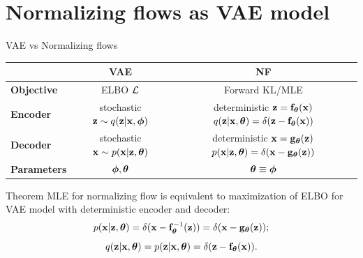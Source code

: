 \section{Normalizing flows as VAE model}
\begin{frame}{VAE vs Normalizing flows}
	\begin{table}[]
		\begin{tabular}{l|c|c}
			& \textbf{VAE} & \textbf{NF} \\ \hline
			\textbf{Objective} & ELBO $\mathcal{L}$ & Forward KL/MLE \\ \hline
			\textbf{Encoder} & \shortstack{stochastic \\ $\mathbf{z} \sim q (\mathbf{z} | \mathbf{x}, \boldsymbol{\phi})$} &  \shortstack{\\ deterministic \\ $\mathbf{z} = \mathbf{f}_{\boldsymbol{\theta}}(\mathbf{x})$ \\ $q(\mathbf{z} | \mathbf{x}, \boldsymbol{\theta}) = \delta(\mathbf{z} - \mathbf{f}_{\boldsymbol{\theta}}(\mathbf{x}))$}  \\ \hline
			\textbf{Decoder} & \shortstack{stochastic \\ $\mathbf{x} \sim p (\mathbf{x} | \mathbf{z}, \boldsymbol{\theta})$} & \shortstack{\\ deterministic \\ $\mathbf{x} = \mathbf{g}_{\boldsymbol{\theta}}(\mathbf{z})$ \\ $ p(\mathbf{x} | \mathbf{z}, \boldsymbol{\theta}) = \delta(\mathbf{x} - \mathbf{g}_{\boldsymbol{\theta}}(\mathbf{z}))$} \\ \hline
			\textbf{Parameters}  & $\boldsymbol{\phi}, \boldsymbol{\theta}$ & $\boldsymbol{\theta} \equiv \boldsymbol{\phi}$\\ 
		\end{tabular}
	\end{table}
	\begin{block}{Theorem}
		MLE for normalizing flow is equivalent to maximization of ELBO for VAE model with deterministic encoder and decoder:
		\vspace{-0.3cm}
		\[
			p(\mathbf{x} | \mathbf{z}, \boldsymbol{\theta}) = \delta (\mathbf{x} - \mathbf{f}^{-1}_{\boldsymbol{\theta}}(\mathbf{z})) = \delta (\mathbf{x} - \mathbf{g}_{\boldsymbol{\theta}}(\mathbf{z}));
		\]
		\[
			q(\mathbf{z} | \mathbf{x}, \boldsymbol{\theta}) = p(\mathbf{z} | \mathbf{x}, \boldsymbol{\theta}) = \delta (\mathbf{z} - \mathbf{f}_{\boldsymbol{\theta}}(\mathbf{x})).
		\]
	\end{block}
\end{frame}
